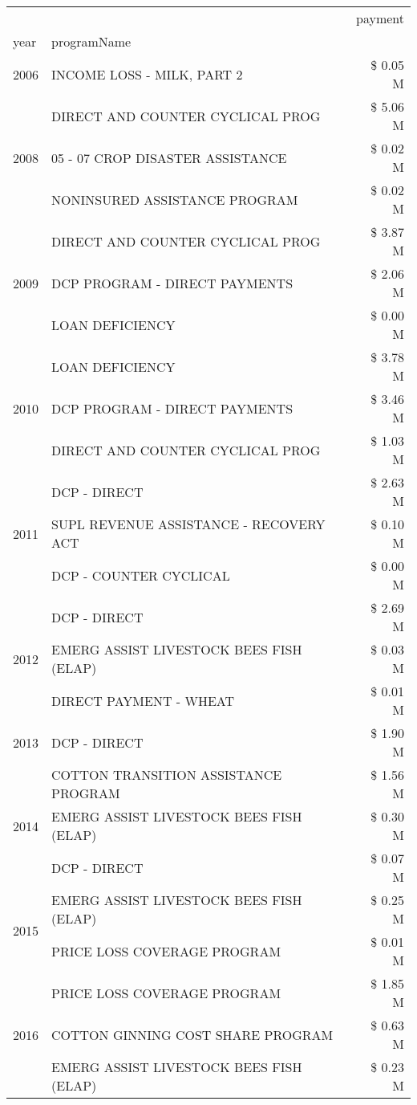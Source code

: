 \begin{tabular}{llr}
\toprule
 &  & payment \\
year & programName &  \\
\midrule
2006 & INCOME LOSS - MILK, PART 2 & \$ 0.05 M \\
\cline{1-3}
\multirow[t]{3}{*}{2008} & DIRECT AND COUNTER CYCLICAL PROG & \$ 5.06 M \\
 & 05 - 07 CROP DISASTER ASSISTANCE & \$ 0.02 M \\
 & NONINSURED ASSISTANCE PROGRAM & \$ 0.02 M \\
\cline{1-3}
\multirow[t]{3}{*}{2009} & DIRECT AND COUNTER CYCLICAL PROG & \$ 3.87 M \\
 & DCP PROGRAM - DIRECT PAYMENTS & \$ 2.06 M \\
 & LOAN DEFICIENCY & \$ 0.00 M \\
\cline{1-3}
\multirow[t]{3}{*}{2010} & LOAN DEFICIENCY & \$ 3.78 M \\
 & DCP PROGRAM - DIRECT PAYMENTS & \$ 3.46 M \\
 & DIRECT AND COUNTER CYCLICAL PROG & \$ 1.03 M \\
\cline{1-3}
\multirow[t]{3}{*}{2011} & DCP - DIRECT & \$ 2.63 M \\
 & SUPL REVENUE ASSISTANCE - RECOVERY ACT & \$ 0.10 M \\
 & DCP - COUNTER CYCLICAL & \$ 0.00 M \\
\cline{1-3}
\multirow[t]{3}{*}{2012} & DCP - DIRECT & \$ 2.69 M \\
 & EMERG ASSIST LIVESTOCK BEES FISH (ELAP) & \$ 0.03 M \\
 & DIRECT PAYMENT - WHEAT & \$ 0.01 M \\
\cline{1-3}
2013 & DCP - DIRECT & \$ 1.90 M \\
\cline{1-3}
\multirow[t]{3}{*}{2014} & COTTON TRANSITION ASSISTANCE PROGRAM & \$ 1.56 M \\
 & EMERG ASSIST LIVESTOCK BEES FISH (ELAP) & \$ 0.30 M \\
 & DCP - DIRECT & \$ 0.07 M \\
\cline{1-3}
\multirow[t]{2}{*}{2015} & EMERG ASSIST LIVESTOCK BEES FISH (ELAP) & \$ 0.25 M \\
 & PRICE LOSS COVERAGE PROGRAM & \$ 0.01 M \\
\cline{1-3}
\multirow[t]{3}{*}{2016} & PRICE LOSS COVERAGE PROGRAM                   & \$ 1.85 M \\
 & COTTON GINNING COST SHARE PROGRAM             & \$ 0.63 M \\
 & EMERG ASSIST LIVESTOCK BEES FISH (ELAP)       & \$ 0.23 M \\

\end{tabular}
